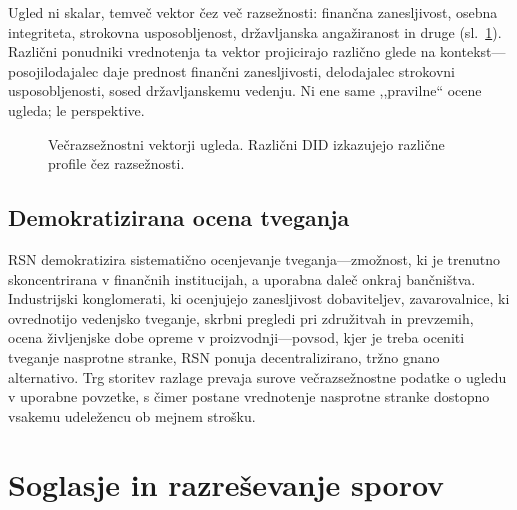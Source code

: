 \documentclass[11pt,a4paper,twocolumn]{article}
\begin{document}
Ugled ni skalar, temveč vektor čez več razsežnosti: finančna zanesljivost, osebna integriteta, strokovna usposobljenost, državljanska angažiranost in druge (sl.~\ref{fig:reputation-radar}). Različni ponudniki vrednotenja ta vektor projicirajo različno glede na kontekst---posojilodajalec daje prednost finančni zanesljivosti, delodajalec strokovni usposobljenosti, sosed državljanskemu vedenju. Ni ene same ,,pravilne`` ocene ugleda; le perspektive.

\begin{figure}[ht]
\centering
{}
\caption{Večrazsežnostni vektorji ugleda. Različni DID izkazujejo različne profile čez razsežnosti.}
\label{fig:reputation-radar}
\end{figure}

\subsection{Demokratizirana ocena tveganja}

RSN demokratizira sistematično ocenjevanje tveganja---zmožnost, ki je trenutno skoncentrirana v finančnih institucijah, a uporabna daleč onkraj bančništva. Industrijski konglomerati, ki ocenjujejo zanesljivost dobaviteljev, zavarovalnice, ki ovrednotijo vedenjsko tveganje, skrbni pregledi pri združitvah in prevzemih, ocena življenjske dobe opreme v proizvodnji---povsod, kjer je treba oceniti tveganje nasprotne stranke, RSN ponuja decentralizirano, tržno gnano alternativo. Trg storitev razlage prevaja surove večrazsežnostne podatke o ugledu v uporabne povzetke, s čimer postane vrednotenje nasprotne stranke dostopno vsakemu udeležencu ob mejnem strošku.

\section{Soglasje in razreševanje sporov}
\end{document}
